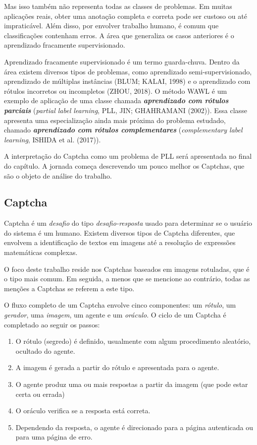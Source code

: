 \documentclass[12pt,twoside,brazilian]{book}
\providecommand{\tightlist}{%
  \setlength{\itemsep}{0pt}\setlength{\parskip}{0pt}}
\begin{document}
Mas isso também não representa todas as classes de problemas. Em muitas
aplicações reais, obter uma anotação completa e correta pode ser custoso
ou até impraticável. Além disso, por envolver trabalho humano, é comum
que classificações contenham erros. A área que generaliza os casos
anteriores é o aprendizado fracamente supervisionado.

Aprendizado fracamente supervisionado é um termo guarda-chuva. Dentro da
área existem diversos tipos de problemas, como aprendizado
semi-supervisionado, aprendizado de múltiplas instâncias (BLUM; KALAI,
1998) e o aprendizado com rótulos incorretos ou incompletos (ZHOU,
2018). O método WAWL é um exemplo de aplicação de uma classe chamada
\textbf{\emph{aprendizado com rótulos parciais}} (\emph{partial label
learning}, PLL, JIN; GHAHRAMANI (2002)). Essa classe apresenta uma
especialização ainda mais próxima do problema estudado, chamado
\textbf{\emph{aprendizado com rótulos complementares}}
(\emph{complementary label learning}, ISHIDA et al. (2017)).

A interpretação do Captcha como um problema de PLL será apresentada no
final do capítulo. A jornada começa descrevendo um pouco melhor os
Captchas, que são o objeto de análise do trabalho.

\hypertarget{sec-definicao-captcha}{%
\subsection{Captcha}\label{sec-definicao-captcha}}

Captcha é um \emph{desafio} do tipo \emph{desafio-resposta} usado para
determinar se o usuário do sistema é um humano. Existem diversos tipos
de Captcha diferentes, que envolvem a identificação de textos em imagens
até a resolução de expressões matemáticas complexas.

O foco deste trabalho reside nos Captchas baseados em imagens rotuladas,
que é o tipo mais comum. Em seguida, a menos que se mencione ao
contrário, todas as menções a Captchas se referem a este tipo.

O fluxo completo de um Captcha envolve cinco componentes: um
\emph{rótulo}, um \emph{gerador}, uma \emph{imagem}, um agente e um
\emph{oráculo}. O ciclo de um Captcha é completado ao seguir os passos:

\begin{enumerate}
\def\labelenumi{\arabic{enumi}.}
\tightlist
\item
  O rótulo (segredo) é definido, usualmente com algum procedimento
  aleatório, ocultado do agente.
\item
  A imagem é gerada a partir do rótulo e apresentada para o agente.
\item
  O agente produz uma ou mais respostas a partir da imagem (que pode
  estar certa ou errada)
\item
  O oráculo verifica se a resposta está correta.
\item
  Dependendo da resposta, o agente é direcionado para a página
  autenticada ou para uma página de erro.
\end{enumerate}
\end{document}
